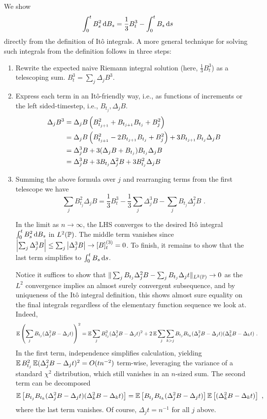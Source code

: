 \documentclass{article}
\begin{document}
We show
\[
  \int_0^t B_s^2\d{B_s}=\frac{1}{3}B_t^3-\int_0^tB_s\d{s}
\]
directly from the definition of It\^{o} integrals. A more general technique for solving such integrals from the definition follows in three steps:

\begin{enumerate}
\item Rewrite the expected naive Riemann integral solution (here, \(\frac{1}{3}B_t^3\)) as a telescoping sum. \(B_t^3=\sum_j\Delta_jB^3\).
\item Express each term in an It\^{o}-friendly way, i.e., as functions of increments or the left sided-timestep, i.e., \(B_{t_j},\Delta_jB\).
  \begin{align*}
    \Delta_jB^3&=\Delta_jB\pa{B_{t_{j+1}}^2+B_{t_{j+1}}B_{t_j}+B_{j}^2}\\
    &=\Delta_jB\pa{B_{t_{j+1}}^2-2B_{t_{j+1}}B_{t_j}+B_{j}^2}+3B_{t_{j+1}}B_{t_j}\Delta_jB\\
    &=\Delta_j^3B+3(\Delta_jB+B_{t_j})B_{t_j}\Delta_jB\\
    &=\Delta_j^3B+3B_{t_j}\Delta_j^2B+3B_{t_j}^2\Delta_jB
  \end{align*}
\item Summing the above formula over \(j\) and rearranging terms from the first telescope we have
  \[
    \sum_jB_{t_j}^2\Delta_jB=\frac{1}{3}B_t^3-\frac{1}{3}\sum_j\Delta_j^3B-\sum_jB_{t_j}\Delta_j^2B\,\,.
  \]

  In the limit as \(n\rightarrow\infty\), the LHS converges to the desired It\^{o} integral \(  \int_0^t B_s^2\d{B_s}\) in \(L^2(\P)\). The middle term vanishes since \(\abs{\sum_j\Delta_j^3B}\le\sum_j\abs{\Delta_j^3B}\rightarrow[B]_t^{(3)}=0\). To finish, it remains to show that the last term simplifies to \(\int_0^tB_s\d{s}\).

  Notice it suffices to show that \(\|\sum_jB_{t_j}\Delta_j^2B-\sum_jB_{t_j}\Delta_jt\|_{L^2(\P)}\rightarrow 0\) as the \(L^2\) convergence implies an almost surely convergent subsequence, and by uniqueness of the It\^{o} integral definition, this shows almost sure equality on the final integrals regardless of the elementary function sequence we look at. Indeed,
\begin{align*}
  \E\pa{\sum_jB_{t_j}(\Delta_j^2B-\Delta_jt)}^2
    &=\E\sum_jB_{t_j}^2(\Delta_j^2B-\Delta_jt)^2+2\E\sum_j\sum_{k> j}B_{t_j}B_{t_k}(\Delta_j^2B-\Delta_jt)(\Delta_k^2B-\Delta_kt)\,\,.
\end{align*}
In the first term, independence simplifies calculation, yielding \(\E B_{t_j}^2\E(\Delta_j^2B-\Delta_jt)^2=O(tn^{-2})\) term-wise, leveraging the variance of a standard \(\chi^2\) distribution, which still vanishes in an \(n\)-sized sum. The second term can be decomposed
\[
  \E \ha{B_{t_j}B_{t_k}(\Delta_j^2B-\Delta_jt)(\Delta_k^2B-\Delta_kt)}
  =  \E \ha{B_{t_j}B_{t_k}(\Delta_j^2B-\Delta_jt)}\E\ha{(\Delta_k^2B-\Delta_kt)}\,\,,
\]
where the last term vanishes. Of course, \(\Delta_jt=n^{-1}\) for all \(j\) above.
  \end{enumerate}
\end{document}
